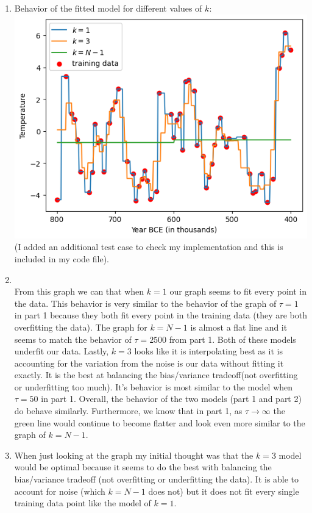 \documentclass[submit]{harvardml}
\begin{document}
\begin{enumerate}
    \item  Behavior of the fitted model for different values of $k$:\\
    \includegraphics[scale=0.8
    ]{hw1/knnGraph.png}\\
    (I added an additional test case to check my implementation and this is included in my code file).\\
    \item\\
    From this graph we can that when $k=1$ our graph seems to fit every point in the data. This behavior is very similar to the behavior of the graph of $\tau=1$ in part 1 because they both fit every point in the training data (they are both overfitting the data). The graph for $k=N-1$ is almost a flat line and it seems to match the behavior of $\tau=2500$ from part 1. Both of these models underfit our data. Lastly, $k=3$ looks like it is interpolating best as it is accounting for the variation from the noise is our data without fitting it exactly. It is the best at balancing the bias/variance tradeoff(not overfitting or underfitting too much). It's behavior is most similar to the model when $\tau=50$ in part 1. Overall, the behavior of the two models (part 1 and part 2) do behave similarly. Furthermore, we know that in part 1, as $\tau \rightarrow \infty$ the green line would continue to become flatter and look even more similar to the graph of $k=N-1$. \\
    \item
    When just looking at the graph my initial thought was that the $k=3$ model would be optimal because it seems to do the best with balancing the bias/variance tradeoff (not overfitting or underfitting the data). It is able to account for noise (which $k=N-1$ does not) but it does not fit every single training data point like the model of $k=1$.\\

\end{enumerate}
\end{document}
